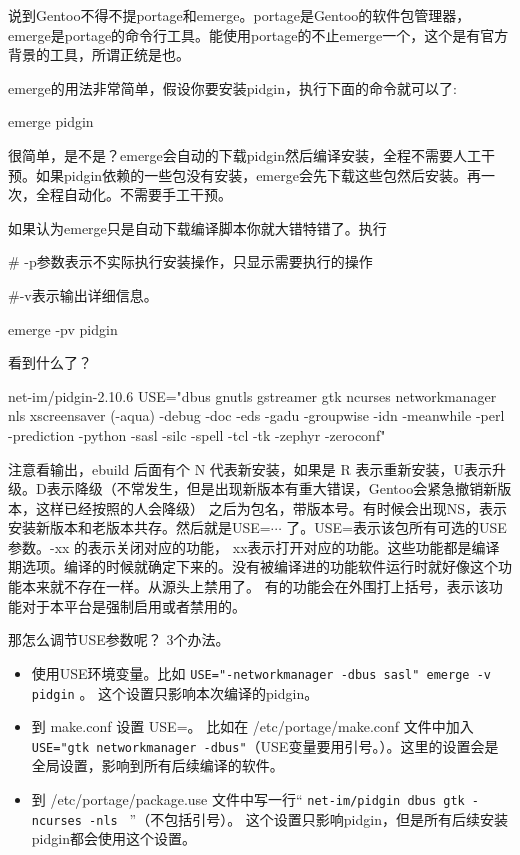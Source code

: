说到Gentoo不得不提portage和emerge。portage是Gentoo的软件包管理器，emerge是portage的命令行工具。能使用portage的不止emerge一个，这个是有官方背景的工具，所谓正统是也。

emerge的用法非常简单，假设你要安装pidgin，执行下面的命令就可以了:
\begin{code}
emerge pidgin
\end{code}

很简单，是不是？emerge会自动的下载pidgin然后编译安装，全程不需要人工干预。如果pidgin依赖的一些包没有安装，emerge会先下载这些包然后安装。再一次，全程自动化。不需要手工干预。

如果认为emerge只是自动下载编译脚本你就大错特错了。执行
\begin{code}
\# -p参数表示不实际执行安装操作，只显示需要执行的操作

\#-v表示输出详细信息。

emerge -pv pidgin
\end{code}

看到什么了？

\begin{code}
[ebuild   N    ] net-im/pidgin-2.10.6 USE="dbus gnutls gstreamer gtk ncurses networkmanager nls xscreensaver (-aqua) -debug -doc -eds -gadu -groupwise -idn -meanwhile -perl -prediction -python -sasl -silc -spell -tcl -tk -zephyr -zeroconf"
\end{code}

注意看输出，ebuild 后面有个 N 代表新安装，如果是 R 表示重新安装，U表示升级。D表示降级（不常发生，但是出现新版本有重大错误，Gentoo会紧急撤销新版本，这样已经按照的人会降级）
之后为包名，带版本号。有时候会出现NS，表示安装新版本和老版本共存。然后就是USE=$\cdots$ 了。USE=表示该包所有可选的USE参数。-xx 的表示关闭对应的功能， xx表示打开对应的功能。这些功能都是编译期选项。编译的时候就确定下来的。没有被编译进的功能软件运行时就好像这个功能本来就不存在一样。从源头上禁用了。
有的功能会在外围打上括号，表示该功能对于本平台是强制启用或者禁用的。

那怎么调节USE参数呢？ 3个办法。

\begin{itemize}
\item 使用USE环境变量。比如{ \tt  USE="-networkmanager -dbus sasl" emerge -v pidgin} 。 这个设置只影响本次编译的pidgin。
\item 到 make.conf 设置 USE=。 比如在 /etc/portage/make.conf 文件中加入 {\tt USE="gtk networkmanager -dbus"}（USE变量要用引号。）。这里的设置会是全局设置，影响到所有后续编译的软件。
\item 到 /etc/portage/package.use 文件中写一行“ { \tt  net-im/pidgin dbus gtk -ncurses -nls } ”（不包括引号）。 这个设置只影响pidgin，但是所有后续安装pidgin都会使用这个设置。
\end{itemize}

